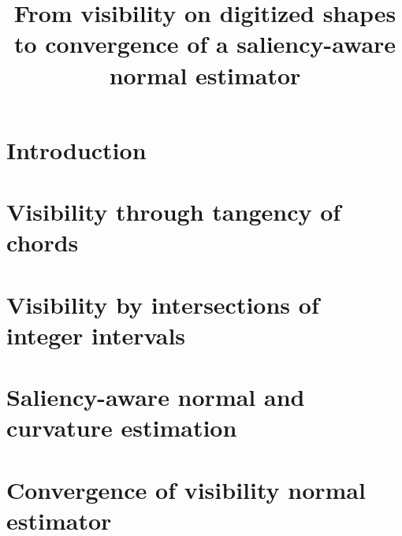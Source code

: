 \documentclass[iicol,pdflatex,sn-mathphys-num]{sn-jnl}
\theoremstyle{definition}
\begin{document}
%
    \title[Visibility on digitized shapes and convergence of a normal estimator]{From visibility on digitized shapes to convergence of a saliency-aware normal estimator}
    \author*[1]{ }
    \author[1]{ }


    \maketitle              %
%




    \section{Introduction}
    



    \section{Visibility through tangency of chords}
    



    \section{Visibility by intersections of integer intervals}
    



    \section{Saliency-aware normal and curvature estimation}
    



    \section{Convergence of visibility normal estimator}
    
\end{document}
